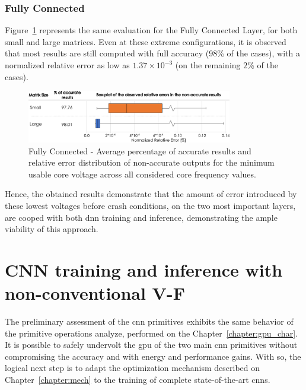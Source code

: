 \subsubsection{Fully Connected}

Figure~\ref{fig:MatrixMult_errors} represents the same evaluation for the Fully Connected Layer, for both small and large matrices. Even at these extreme configurations, it is observed that most results are still computed with full accuracy (98\% of the cases), with a normalized relative error as low as $1.37\times10^{-3}$ (on the remaining $2$\% of the cases).

\begin{figure}[htbp]
    \centering
        \includegraphics[width=0.8\textwidth]{Figures/Application To Deep Learning/MatrixMul_Error_Distribution.pdf}
        \caption{Fully Connected - Average percentage of accurate results and relative error distribution of non-accurate outputs for the minimum usable core voltage across all considered core frequency values.}
    \label{fig:MatrixMult_errors}
\end{figure}

Hence, the obtained results demonstrate that the amount of error introduced by these lowest voltages before crash conditions, on the two most important layers, are cooped with both \acrshort{dnn} training and inference, demonstrating the ample viability of this approach.

\newpage
\section{CNN training and inference with non-conventional V-F}
\label{section:enhanced}

The preliminary assessment of the \acrshort{cnn} primitives exhibits the same behavior of the primitive operations analyze, performed on the Chapter~\ref{chapter:gpu_char}. It is possible to safely undervolt the \acrshort{gpu} of the two main \acrshort{cnn} primitives without compromising the accuracy and with energy and performance gains. With so, the logical next step is to adapt the optimization mechanism described on Chapter~\ref{chapter:mech} to the training of complete state-of-the-art \acrshort{cnn}s.


